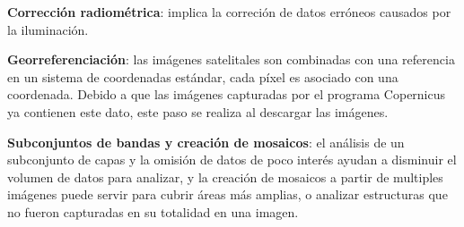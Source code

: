 
{\bf Corrección radiométrica}: implica la correción de datos erróneos causados por la iluminación.


{\bf Georreferenciación}: las imágenes satelitales son combinadas con una referencia en un sistema de coordenadas estándar, cada píxel es asociado con una coordenada. Debido a que las imágenes capturadas por el programa Copernicus ya contienen este dato, este paso se realiza al descargar las imágenes.

{\bf Subconjuntos de bandas y creación de mosaicos}: el análisis de un subconjunto de capas y la omisión de datos de poco interés ayudan a disminuir el volumen de datos para analizar, y la creación de mosaicos a partir de multiples imágenes puede servir para cubrir áreas más amplias, o analizar estructuras que no fueron capturadas en su totalidad en una imagen.

